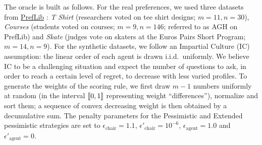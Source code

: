 \documentclass{article}
\begin{document}
The oracle is built as follows. 
For the real preferences, we used three datasets from \href{https://www.preflib.org/}{PrefLib} \citep{PrefLib}: \textit{T Shirt} (researchers voted on tee shirt designs; $m \!=\! 11, n \!=\! 30$),
\textit{Courses}  (students voted on courses; $m \!=\! 9, n \!=\! 146$; referred to as AGH on PrefLib)
and \emph{Skate} (judges vote on skaters at the Euros Pairs Short Program; $m \!=\! 14, n \!=\! 9$).
For the synthetic datasets, we follow an Impartial Culture (IC) assumption: the linear order of each agent is drawn i.i.d.\ uniformly.
We believe IC to be a challenging situation and expect the number of questions to ask, in order to reach a certain level of regret, to decrease with less varied profiles.
To generate the weights of the scoring rule, we first draw $m \!-\! 1$ numbers uniformly at random (in the interval $\llbracket 0,1 \rrbracket$ representing weight ``differences''), normalize and sort them; a sequence of convex decreasing weight is then obtained by a decumulative sum. The penalty parameters for the Pessimistic and Extended pessimistic strategies are set to  $\epsilon_{\text{chair}} = 1.1$, $\epsilon'_{\text{chair}} = 10^{-6}$, $\epsilon_{\text{agent}} = 1.0$ and $\epsilon'_{\text{agent}} = 0$.
\end{document}
